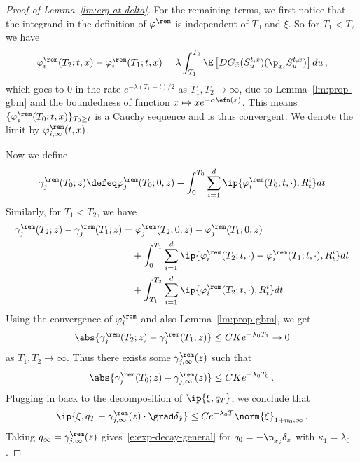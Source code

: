 \documentclass{amsart}
\begin{document}
\begin{proof}[Proof of Lemma~\ref{lm:erg-at-delta}]
	For the remaining terms, we first notice that the integrand in the definition of $\varphi^\rem$ is independent of $T_0$ and $\xi$. 
	So for $T_1 < T_2$ we have 
	\begin{equation*}
		\varphi_i^\rem(T_2; t,x) - \varphi_i^\rem(T_1; t,x) = \lambda \int_{T_1}^{T_2} \E \left[ D G_{\tilde x} (S^{t,x}_u) (\p_{x_i} S^{t,x}_u) \right] du \,,
	\end{equation*}
	which goes to $0$ in the rate $e^{-\lambda  (T_1-t)/2}$ as $T_1, T_2 \to \infty$, due to Lemma~\ref{lm:prop-gbm} and the boundedness of function $x \mapsto x e^{-\alpha \efn(x)}$.
	This means $\{\varphi_i^\rem(T_0;t,x)\}_{T_0 \ge t}$ is a Cauchy sequence and is thus convergent. 
	We denote the limit by $\varphi_{i,\infty}^\rem(t,x)$. 

	Now we define 
	\begin{equation*}
		\gamma_j^\rem(T_0; z) \defeq \varphi_j^\rem(T_0;0,z) - \int_0^{T_0} \sum_{i=1}^d \ip{ \varphi_i^\rem(T_0;t,\cdot), R^i_t } dt
	\end{equation*}
	Similarly, for $T_1 < T_2$, we have 
	\begin{align*}
		\gamma_j^\rem(T_2;z) - \gamma_j^\rem(T_1;z) & = \varphi_j^\rem(T_2;0,z) - \varphi_j^\rem(T_1;0,z) \\
		& \quad + \int_0^{T_1} \sum_{i=1}^d \ip{ \varphi_i^\rem(T_2;t,\cdot) - \varphi_i^\rem(T_1;t,\cdot), R^i_t } dt \\
		& \quad + \int_{T_1}^{T_2} \sum_{i=1}^d \ip{\varphi_i^\rem(T_2;t,\cdot), R^i_t} dt
	\end{align*}
	Using the convergence of $\varphi_i^\rem$ and also Lemma~\ref{lm:prop-gbm}, we get 
	\begin{equation*}
		\abs{ \gamma_j^\rem(T_2;z) - \gamma_j^\rem(T_1;z) } \le CK e^{-\lambda_0 T_1} \to 0 
	\end{equation*}
	as $T_1, T_2 \to \infty$. 
	Thus there exists some $\gamma_{j,\infty}^\rem(z)$ such that 
	\begin{equation*}
		\abs{ \gamma_j^\rem(T_0;z)  - \gamma_{j,\infty}^\rem(z) } \le CK e^{-\lambda_0 T_0} \,.
	\end{equation*}
	Plugging in back to the decomposition of $\ip{\xi, q_T}$, we conclude that 
	\begin{equation*}
		\ip{\xi, q_T - \gamma_{j,\infty}^\rem(z) \cdot \grad \delta_{\tilde x}} \le C e^{-\lambda_0 T} \norm{\xi}_{1+n_0,\infty} \,.
	\end{equation*}
	Taking $q_\infty = \gamma_{j,\infty}^\rem(z)$ gives~\eqref{e:exp-decay-general} for $q_0 = -\p_{x_j} \delta_z$ with $\kappa_1 = \lambda_0$. 


\end{proof}
\end{document}
